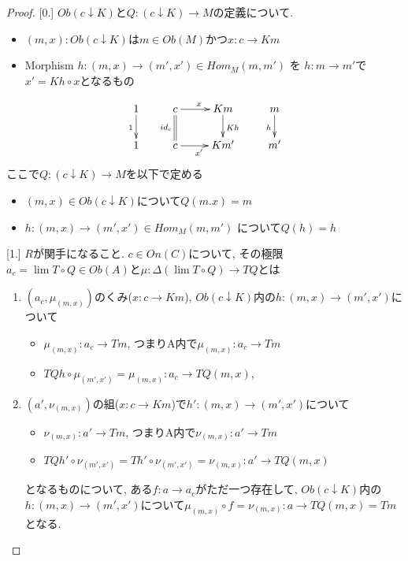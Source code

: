 \documentclass[dvipdfmx,a4paper,11pt]{article}
\theoremstyle{definition}
\begin{document}
\begin{proof}

[0.]
$Ob(c \downarrow K)$と$Q: (c \downarrow K) \to M $の定義について.

\begin{itemize}
\item $(m,x) : Ob(c \downarrow K)$は$m \in Ob(M)$かつ$x : c \to Km$ %
\item Morphism $h : (m,x)  \to (m',x') \in Hom_{M}(m,m') $ を 
$h: m \to m'$で$x'  = Kh \circ x$となるもの
\end{itemize}

\begin{equation*}
\xymatrix@C=25pt@R=20pt{
1 \ar@{->}[d] _{1}&c \ar@{=}[d]_{id_c}  \ar@{->}[r]^{x} & Km\ar@{->}[d]^{Kh} &m\ar@{->}[d]_{h}\\
1&c\ar@{->}[r]_{x'} &Km'&m' \\   
}
\end{equation*}
ここで$Q: (c \downarrow K) \to M $を以下で定める
\begin{itemize}
\item $(m,x) \in Ob(c \downarrow K )$について$Q(m.x) = m$
\item $h : (m,x)  \to (m',x') \in Hom_{M}(m,m') $ について$Q(h) =h$
\end{itemize}

[1.] $R$が関手になること.
$c \in On(C)$について, その極限$a_c =\lim T\circ Q \in Ob(A)$と$\mu: \Delta (\lim T\circ Q) \to TQ$とは
\begin{enumerate}
\item $(a_c , \mu_{(m,x)})$のくみ($x : c \to Km $), $Ob(c \downarrow K )$内の$h : (m,x)\to (m',x')$について
\begin{itemize}
\item $\mu_{(m,x)} : a_c \to Tm  $, つまりA内で$\mu_{(m,x)} :  a_c  \to Tm $
\item $ TQ h  \circ \mu_{(m',x')} = \mu_{(m,x)} :a_c \to  TQ(m,x) $, 
\end{itemize}
\item $(a' , \nu_{(m,x)})$の組($x : c \to Km $)で$h' : (m,x)\to (m',x')$について
\begin{itemize}
\item $\nu_{(m,x)} :  a' \to Tm $, つまりA内で$\nu_{(m,x)} : a' \to Tm $
\item $  TQ h' \circ \nu_{(m',x')}=Th' \circ \nu_{(m',x')}=\nu_{(m,x)} :a '  \to  TQ(m,x) $
\end{itemize}
となるものについて, ある$f : a \to a_c$がただ一つ存在して,  $Ob(c \downarrow K )$内の$h : (m,x)\to (m',x')$について$\mu_{(m,x)} \circ f = \nu_{(m,x)}: a \to TQ(m,x)=Tm$となる.
\end{enumerate}


\end{proof}
\end{document}
